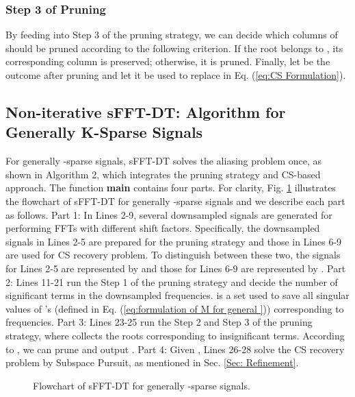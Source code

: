 \documentclass[journal,onecolumn,11pt]{IEEEtran}
\begin{document}
\subsubsection{Step 3 of Pruning}
By feeding  into Step 3 of the pruning strategy, we can decide which columns of  should be pruned according to the following criterion.
If the root belongs to , its corresponding column is preserved; otherwise, it is pruned.
Finally, let  be the outcome after pruning and let it be used to replace  in Eq. (\ref{eq:CS Formulation}).




\subsection{Non-iterative sFFT-DT: Algorithm for Generally K-Sparse Signals}\label{Sec: algorithm for general K sparse}

For generally -sparse signals, sFFT-DT solves the aliasing problem once, as shown in Algorithm 2, which integrates the pruning strategy and CS-based approach.
The function \textbf{main} contains four parts.
For clarity, Fig. \ref{fig:flowchart} illustrates the flowchart of sFFT-DT for generally -sparse signals and we describe each part as follows.
Part 1: In Lines 2-9, several downsampled signals are generated for performing FFTs with different shift factors.
Specifically, the downsampled signals in Lines 2-5 are prepared for the pruning strategy and those in Lines 6-9 are used for CS recovery problem.
To distinguish between these two, the signals for Lines 2-5 are represented by  and those for Lines 6-9 are represented by .
Part 2: Lines 11-21 run the Step 1 of the pruning strategy and decide the number of significant terms in the downsampled frequencies.  is a set used to save all singular values of 's (defined in Eq. (\ref{eq:formulation of M for general })) corresponding to frequencies.
Part 3: Lines 23-25 run the Step 2 and Step 3 of the pruning strategy, where  collects the roots corresponding to insignificant terms.
According to , we can prune  and output .
Part 4: Given , Lines 26-28 solve the CS recovery problem by Subspace Pursuit, as mentioned in Sec. \ref{Sec: Refinement}.

\begin{figure}[t]
\begin{minipage}[b]{.98\linewidth}
\end{minipage}
\hfill
\caption{Flowchart of sFFT-DT for generally -sparse signals.}
\label{fig:flowchart}
\end{figure}
\end{document}
